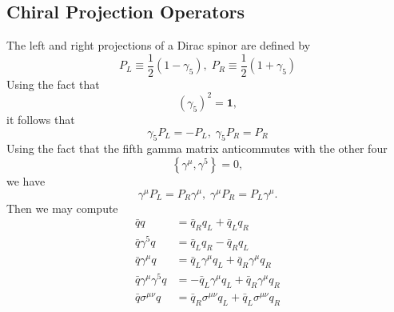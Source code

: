\documentclass{book}[letterpaper,12pt]
\begin{document}
\subsection{Chiral Projection Operators}
The left and right projections of a Dirac spinor are defined by
\begin{equation}
P_L\equiv \frac{1}{2}\left(1-\gamma_5\right),\;P_R\equiv \frac{1}{2}\left(1+\gamma_5\right)
\end{equation}
Using the fact that 
\begin{equation}
\left(\gamma_5\right)^2=\mathbf{1},
\end{equation}
it follows that
\begin{equation}
\gamma_5 P_L = -P_L,\;\gamma_5P_R=P_R
\end{equation}
Using the fact that the fifth gamma matrix anticommutes with the other four
\begin{equation}
\left\{\gamma^{\mu},\gamma^5\right\}=0,
\end{equation}
we have
\begin{equation}
\gamma^{\mu}P_L=P_R\gamma^{\mu},\;\gamma^{\mu}P_R=P_L\gamma^{\mu}.
\end{equation}
Then we may compute
\begin{equation}
\begin{split}
\bar{q}q&=\bar{q}_Rq_L+\bar{q}_Lq_R\\
\bar{q}\gamma^5q&=\bar{q}_Lq_R-\bar{q}_Rq_L\\
\bar{q}\gamma^{\mu}q&=\bar{q}_L\gamma^{\mu}q_L+\bar{q}_R\gamma^{\mu}q_R\\
\bar{q}\gamma^{\mu}\gamma^5 q&=-\bar{q}_L\gamma^{\mu}q_L +\bar{q}_R\gamma^{\mu}q_R\\
\bar{q}\sigma^{\mu\nu}q&=\bar{q}_R\sigma^{\mu\nu}q_L+\bar{q}_L\sigma^{\mu\nu}q_R
\end{split}
\end{equation}
\end{document}

